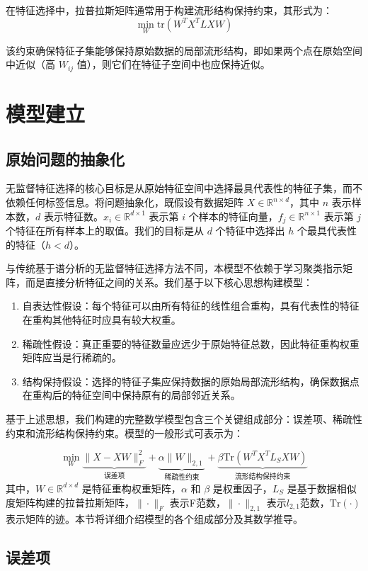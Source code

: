 \documentclass[12pt,a4paper,UTF8]{article}
\begin{document}
  
  在特征选择中，拉普拉斯矩阵通常用于构建流形结构保持约束，其形式为：
  $$
  \min_{W} \text{tr}(W^T X^T L X W)
  $$
  
  
  该约束确保特征子集能够保持原始数据的局部流形结构，即如果两个点在原始空间中近似（高 $W_{ij}$ 值），则它们在特征子空间中也应保持近似。
  
  \section{模型建立}
  \subsection{原始问题的抽象化}
  无监督特征选择的核心目标是从原始特征空间中选择最具代表性的特征子集，而不依赖任何标签信息。将问题抽象化，既假设有数据矩阵 $X \in \mathbb{R}^{n \times d}$，其中 $n$ 表示样本数，$d$ 表示特征数。$x_i \in \mathbb{R}^{d \times 1}$ 表示第 $i$ 个样本的特征向量，$f_j \in \mathbb{R}^{n \times 1}$ 表示第 $j$ 个特征在所有样本上的取值。我们的目标是从 $d$ 个特征中选择出 $h$ 个最具代表性的特征（$h < d$）。
  
  与传统基于谱分析的无监督特征选择方法不同，本模型不依赖于学习聚类指示矩阵，而是直接分析特征之间的关系。我们基于以下核心思想构建模型：
    \begin{enumerate}
  	\item 自表达性假设：每个特征可以由所有特征的线性组合重构，具有代表性的特征在重构其他特征时应具有较大权重。
  	\item 稀疏性假设：真正重要的特征数量应远少于原始特征总数，因此特征重构权重矩阵应当是行稀疏的。
  	\item  结构保持假设：选择的特征子集应保持数据的原始局部流形结构，确保数据点在重构后的特征空间中保持原有的局部邻近关系。
  \end{enumerate}
 
  
  基于上述思想，我们构建的完整数学模型包含三个关键组成部分：误差项、稀疏性约束和流形结构保持约束。模型的一般形式可表示为：
  
  $$
  \min_{W} \underbrace{\|X - XW\|_F^2}_{\text{误差项}} + \underbrace{\alpha\|W\|_{2,1}}_{\text{稀疏性约束}} + \underbrace{\beta\text{Tr}(W^TX^TL_SXW)}_{\text{流形结构保持约束}}
  $$
  其中，$W \in \mathbb{R}^{d \times d}$ 是特征重构权重矩阵，$\alpha$ 和 $\beta$ 是权重因子，$L_S$ 是基于数据相似度矩阵构建的拉普拉斯矩阵，$\|\cdot\|_F$ 表示F范数，$\|\cdot\|_{2,1}$ 表示$l_{2,1}$范数，$\text{Tr}(\cdot)$ 表示矩阵的迹。本节将详细介绍模型的各个组成部分及其数学推导。
  
  
  \subsection{误差项}
\end{document}
